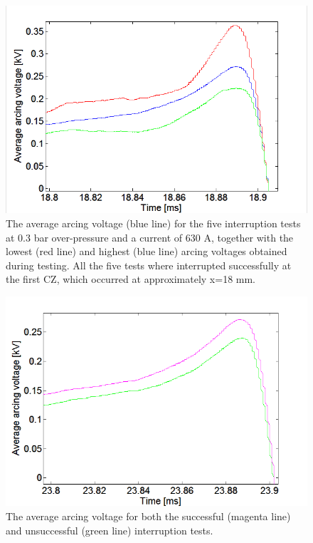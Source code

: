 \documentclass[10pt,b5paper,twoside]{article}
\begin{document}
\begin{figure}[H]
\centering
\includegraphics[scale=0.6, angle =0 ]{Bilder/Results/ArcingVoltage_18_none_reIgnition_average.PNG}
\caption{The average arcing voltage (blue line) for the five interruption tests at 0.3 bar over-pressure and a current of 630 A, together with the lowest (red line) and highest (blue line) arcing voltages obtained during testing. All the five tests where interrupted successfully at the first CZ, which occurred at approximately  x=18 mm.} \label{fig:18mmSuccessful_ave}
\end{figure}

\begin{figure}[H]
\centering
\includegraphics[scale=0.6, angle =0 ]{Bilder/Results/ArcingVoltage_18_both_average.PNG}
\caption{The average arcing voltage for both the successful (magenta line) and unsuccessful (green line) interruption tests.} \label{fig:18mm_both_ave}
\end{figure}
\end{document}
